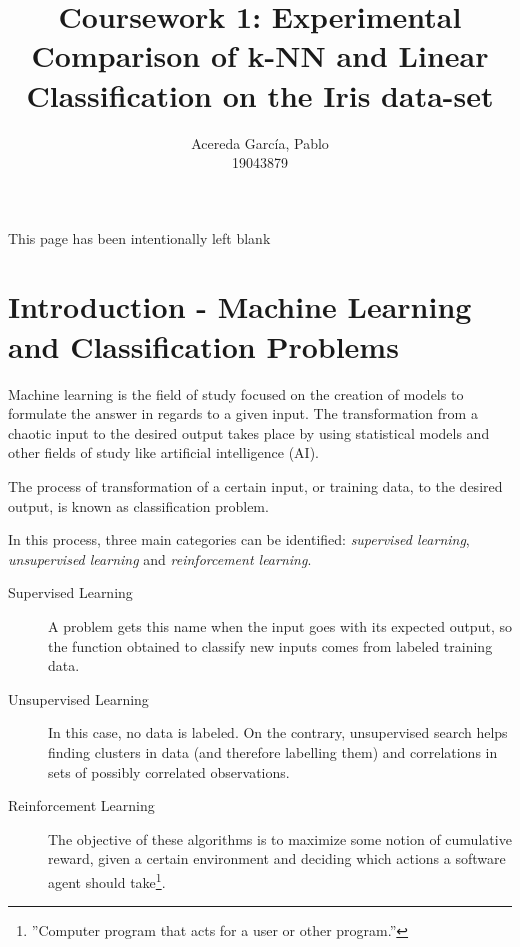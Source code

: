\documentclass[11pt]{article}
\title{Coursework 1: Experimental Comparison of k-NN and Linear Classification
on the Iris data-set}
\author{
Acereda García, Pablo\\
19043879}
\begin{document}
\maketitle

\newpage
\vspace*{\fill}
 \begin{center}
This page has been intentionally left blank
 \end{center}
\vspace*{\fill}
\newpage

\tableofcontents

\newpage

\section{Introduction - Machine Learning and Classification Problems}

Machine learning is the field of study focused on the creation of models to
formulate the answer in regards to a given input. The transformation from a
chaotic input to the desired output takes place by using statistical models and
other fields of study like artificial intelligence (AI).

The process of transformation of a certain input, or training data, to the
desired output, is known as classification problem.

In this process, three main categories can be identified: 
\textit{supervised learning}, \textit{unsupervised learning} and
\textit{reinforcement learning}.

\begin{description}
 
 \item [Supervised Learning] A problem gets this name when the input goes with
  its expected output, so the function obtained to classify new inputs comes
  from labeled training data.
 
 \item [Unsupervised Learning] In this case, no data is labeled. On the 
  contrary, unsupervised search helps finding clusters in data (and therefore 
  labelling them) and correlations in sets of possibly correlated observations.

 \item [Reinforcement Learning] The objective of these algorithms is to maximize
  some notion of cumulative reward, given a certain environment and deciding
  which actions a software agent should take\footnote{''Computer program that
  acts for a user or other program.''}.

\end{description}
\end{document}

